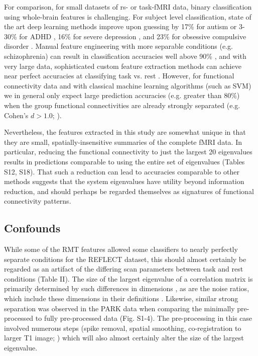 \documentclass[10pt]{article}
\begin{document}
For comparison, for small datasets of rs- or task-fMRI data, binary classification using whole-brain
features is challenging. For subject level classification, state of the art deep learning methods
improve upon guessing by 17\% for autism \citep{bengs4DSpatioTemporalDeep2020} or 3-30\% for ADHD
\citep{riazDeepFMRIEndtoendDeep2020}, 16\% for severe depression
\citep{ramasubbuAccuracyAutomatedClassification2016}, and 23\% for obsessive compulsive disorder
\citep{takagiNeuralMarkerObsessiveCompulsive2017}. Manual feature engineering with more separable
conditions (e.g. schizophrenia) can result in classification accuracies well above 90\%
\citep{duHighClassificationAccuracy2012}, and with very large data, sophisticated custom feature
extraction methods can achieve near perfect accuracies at classifying task vs. rest
\citep{zhangCharacterizingDifferentiatingTaskbased2016}. However, for functional connectivity data
and with classical machine learning algorithms (such as SVM) we in general only expect large
prediction accuracies (e.g. greater than 80\%) when the group functional connectivities are already
strongly separated (e.g. Cohen’s \(d > 1.0\); \citealp{dansereauStatisticalPowerPrediction2017}).

Nevertheless, the features extracted in this study are somewhat unique in that they are small,
spatially-insensitive summaries of the complete fMRI data. In particular, reducing the functional
connectivity to just the largest 20 eigenvalues results in predictions comparable to using the
entire set of eigenvalues (Tables S12, S18). That such a reduction can lead to accuracies comparable
to other methods suggests that the system eigenvalues have utility beyond information reduction, and
should perhaps be regarded themselves as signatures of functional connectivity patterns.

\subsection{Confounds}
While some of the RMT features allowed some classifiers to nearly perfectly separate conditions for
the REFLECT dataset, this should almost certainly be regarded as an artifact of the differing scan
parameters between task and rest conditions (Table II). The size of the largest eigenvalue of a
correlation matrix is primarily determined by such differences in dimensions
\citep{yinLimitLargestEigenvalue1988}, as are the noise ratios, which include these dimensions in
their definitions \citep{veraartDiffusionMRINoise2016,veraartDenoisingDiffusionMRI2016}. Likewise,
similar strong separation was observed in the PARK data when comparing the minimally pre-processed
to fully pre-processed data (Fig. S1-4). The pre-processing in this case involved numerous steps
(spike removal, spatial smoothing, co-registration to larger T1 image;
\citealp{madhyasthaDynamicConnectivityRest2015}) which will also almost certainly alter the size of
the largest eigenvalue.
\end{document}
